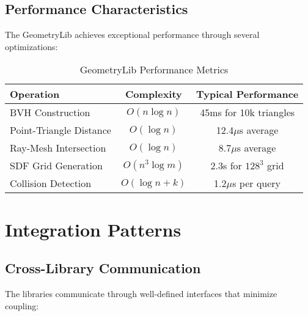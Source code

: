 \subsection{Performance Characteristics}

The GeometryLib achieves exceptional performance through several optimizations:

\begin{table}[H]
\centering
\caption{GeometryLib Performance Metrics}
\label{tab:geometrylib_performance}
\begin{tabular}{@{}lcc@{}}
\toprule
\textbf{Operation} & \textbf{Complexity} & \textbf{Typical Performance} \\
\midrule
BVH Construction & $O(n \log n)$ & 45ms for 10k triangles \\
Point-Triangle Distance & $O(\log n)$ & 12.4$\mu$s average \\
Ray-Mesh Intersection & $O(\log n)$ & 8.7$\mu$s average \\
SDF Grid Generation & $O(n^3 \log m)$ & 2.3s for $128^3$ grid \\
Collision Detection & $O(\log n + k)$ & 1.2$\mu$s per query \\
\bottomrule
\end{tabular}
\end{table}

\section{Integration Patterns}
\label{sec:integration_patterns}

\subsection{Cross-Library Communication}

The libraries communicate through well-defined interfaces that minimize coupling:

